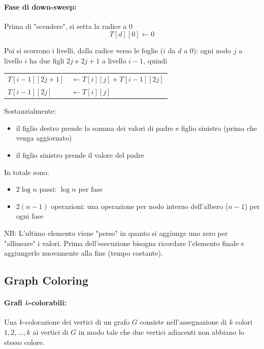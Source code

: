\paragraph{Fase di down-sweep:} Prima di "scendere", si setta la radice a $0$
$$ T[d][0] \leftarrow 0 $$

Poi si scorrono i livelli, dalla radice verso le foglie ($i$ da $d$ a $0$): ogni nodo $j$ a livello $i$ ha due figli $2j$ e $2j+1$ a livello $i-1$, quindi 
\begin{center}
    \begin{tabular}{l l}
        $T[i-1][2j + 1]$ & $\leftarrow T[i][j] + T[i-1][2j]$ \\
        $T[i-1][2j]$ & $\leftarrow T[i][j]$
    \end{tabular}
\end{center}

\begin{center}
    
\end{center}

Sostanzialmente: 
\begin{itemize}
    \item il figlio destro prende la somma dei valori di padre e figlio sinistro (prima che venga aggiornato)
    
    \item il figlio sinistro prende il valore del padre
\end{itemize}

In totale sono:
\begin{itemize}
    \item $2 \log n$ passi: $\log n$ per fase
    
    \item $2 (n-1)$ operazioni: una operazione per nodo interno dell'albero ($n-1$) per ogni fase
\end{itemize}

NB: L'ultimo elemento viene "perso" in quanto si aggiunge uno zero per "allineare" i valori. Prima dell'esecuzione bisogna ricordare l'elemento finale e aggiungerlo nuovamente alla fine (tempo costante).

\subsection{Graph Coloring}

\paragraph{Grafi $k$-colorabili:} Una $k$-colorazione dei vertici di un grafo $G$ consiste nell'assegnazione di $k$ colori $1, 2, \dots, k$ ai vertici di $G$ in modo tale che due vertici adiacenti non abbiano lo stesso colore.


